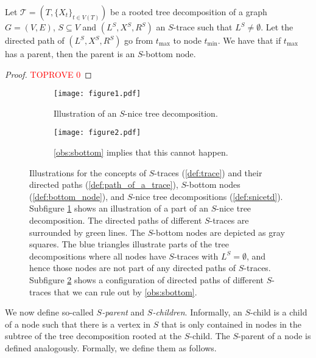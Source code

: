 \documentclass[a4paper,UKenglish,cleveref, autoref, thm-restate, numberwithinsect]{lipics-v2021}
\begin{document}
\begin{observation}\label{obs:sbottom}
    Let $\mathcal{T}=(T,\{X_t\}_{t\in V(T)})$ be a rooted tree decomposition of a graph $G=(V,E)$, $S\subseteq V$ and $(L^S, X^S, R^S)$ an $S$-trace such that $L^S\ne \emptyset$. Let the directed path of $(L^S, X^S, R^S)$ go from $t_{\max}$ to node $t_{\min}$. We have that if $t_{\max}$ has a parent, then the parent is an $S$-bottom node.
\end{observation}
\begin{proof}\textcolor{red}{TOPROVE 0}\end{proof}

\begin{figure}[t]
\centering
\begin{subfigure}[t]{0.49\textwidth}
\centering
\texttt{[image: figure1.pdf]}
\caption{Illustration of an $S$-nice tree decomposition.}\label{fig:tracesa}
\end{subfigure}
\begin{subfigure}[t]{0.49\textwidth}
\centering
\texttt{[image: figure2.pdf]}
\caption{\cref{obs:sbottom} implies that this cannot happen.}\label{fig:tracesb}
\end{subfigure}
\caption{Illustrations for the concepts of $S$-traces (\cref{def:trace}) and their directed paths (\cref{def:path_of_a_trace}), $S$-bottom nodes (\cref{def:bottom_node}), and $S$-nice tree decompositions (\cref{def:snicetd}). Subfigure \ref{fig:tracesa} shows an illustration of a part of an $S$-nice tree decomposition. The directed paths of different $S$-traces are surrounded by green lines. The $S$-bottom nodes are depicted as gray squares. The blue triangles illustrate parts of the tree decompositions where all nodes have $S$-traces with $L^S=\emptyset$, and hence those nodes are not part of any directed paths of $S$-traces. Subfigure \ref{fig:tracesb} shows a configuration of directed paths of different $S$-traces that we can rule out by \cref{obs:sbottom}.}\label{fig:traces}
\end{figure}


We now define so-called \emph{$S$-parent} and \emph{$S$-children}. Informally, an $S$-child is a child of a node such that there is a vertex in $S$ that is only contained in nodes in the subtree of the tree decomposition rooted at the $S$-child. The $S$-parent of a node is defined analogously. Formally, we define them as follows.
\end{document}
